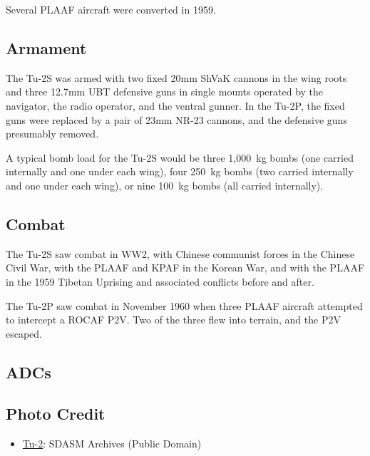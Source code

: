 Several PLAAF aircraft were converted in 1959.

\subsection{Armament}

The Tu-2S was armed with two fixed 20mm ShVaK cannons in the wing roots and three 12.7mm UBT defensive guns in single mounts operated by the navigator, the radio operator, and the ventral gunner. In the Tu-2P, the fixed guns were replaced by a pair of 23mm NR-23 cannons, and the defensive guns presumably removed.

A typical bomb load for the Tu-2S would be three 1,000~kg bombs (one carried internally and one under each wing), four 250~kg bombs (two carried internally and one under each wing), or nine 100~kg bombs (all carried internally).

\subsection{Combat}

The Tu-2S saw combat in WW2, with Chinese communist forces in the Chinese Civil War, with the PLAAF and KPAF in the Korean War, and with the PLAAF in the 1959 Tibetan Uprising and associated conflicts before and after.

The Tu-2P saw combat in November 1960 when three PLAAF aircraft attempted to intercept a ROCAF P2V. Two of the three flew into terrain, and the P2V escaped.

\subsection{ADCs}
\begin{adclist}
\end{adclist}

\subsection{Photo Credit}
\begin{itemize}\raggedright
    \item \href{https://commons.wikimedia.org/wiki/File:Tu-2_45937881.jpg}{Tu-2}: SDASM Archives (Public Domain)
\end{itemize}
